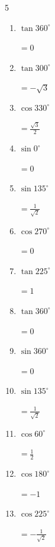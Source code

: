 \begin{multicols}{5}
\begin{enumerate}
  \item $\displaystyle \tan{360^\circ}$

        $\displaystyle =0$

\columnbreak %

  \item $\displaystyle \tan{300^\circ}$

        $\displaystyle =-\sqrt{3}$

  \item $\displaystyle \cos{330^\circ}$

        $\displaystyle =\frac{\sqrt{3}}{2}$

  \item $\displaystyle \sin{0^\circ}$

        $\displaystyle =0$

  \item $\displaystyle \sin{135^\circ}$

        $\displaystyle =\frac{1}{\sqrt{2}}$

  \item $\displaystyle \cos{270^\circ}$

        $\displaystyle =0$

  \item $\displaystyle \tan{225^\circ}$

        $\displaystyle =1$

  \item $\displaystyle \tan{360^\circ}$

        $\displaystyle =0$

  \item $\displaystyle \sin{360^\circ}$

        $\displaystyle =0$

  \item $\displaystyle \sin{135^\circ}$

        $\displaystyle =\frac{1}{\sqrt{2}}$

  \item $\displaystyle \cos{60^\circ}$

        $\displaystyle =\frac{1}{2}$

  \item $\displaystyle \cos{180^\circ}$

        $\displaystyle =-1$

  \item $\displaystyle \cos{225^\circ}$

        $\displaystyle =-\frac{1}{\sqrt{2}}$


\end{enumerate}
\end{multicols}
